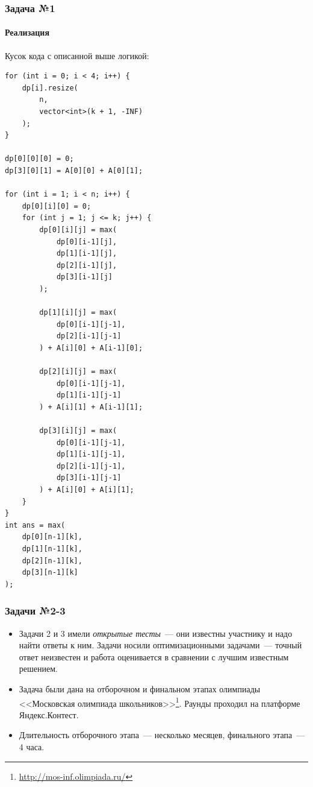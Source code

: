 \documentclass{beamer}
\begin{document}
\begin{frame}[fragile]
\frametitle{Задача №1}
\framesubtitle{Реализация}

Кусок кода с описанной выше логикой:
\begin{multicols}{2}
\begin{lstlisting}[basicstyle=\tiny]
for (int i = 0; i < 4; i++) {
    dp[i].resize(
        n, 
        vector<int>(k + 1, -INF)
    );
}

dp[0][0][0] = 0;
dp[3][0][1] = A[0][0] + A[0][1];

for (int i = 1; i < n; i++) {
    dp[0][i][0] = 0;
    for (int j = 1; j <= k; j++) {
        dp[0][i][j] = max(
            dp[0][i-1][j],
            dp[1][i-1][j],
            dp[2][i-1][j],
            dp[3][i-1][j]
        );

        dp[1][i][j] = max(
            dp[0][i-1][j-1],
            dp[2][i-1][j-1]
        ) + A[i][0] + A[i-1][0];

        dp[2][i][j] = max(
            dp[0][i-1][j-1],
            dp[1][i-1][j-1]
        ) + A[i][1] + A[i-1][1];

        dp[3][i][j] = max(
            dp[0][i-1][j-1],
            dp[1][i-1][j-1],
            dp[2][i-1][j-1],
            dp[3][i-1][j-1]
        ) + A[i][0] + A[i][1];
    }
}
int ans = max(
    dp[0][n-1][k],
    dp[1][n-1][k],
    dp[2][n-1][k],
    dp[3][n-1][k]
);
\end{lstlisting}

\end{multicols}
\end{frame}








\begin{frame}
\frametitle{Задачи №2-3}
\begin{itemize}
\item Задачи 2 и 3 имели \emph{открытые тесты}~--- они известны участнику и надо найти ответы к ним. Задачи носили оптимизационными задачами~--- точный ответ неизвестен и работа  оценивается в сравнении с лучшим известным решением.
\item Задача были дана на отборочном и финальном этапах олимпиады <<Московская олимпиада школьников>>\footnote{\url{http://mos-inf.olimpiada.ru/}}. Раунды проходил на платформе Яндекс.Контест.
\item Длительность отборочного этапа~--- несколько месяцев, финального этапа~--- 4 часа.
\end{itemize}
\end{frame}
\end{document}
